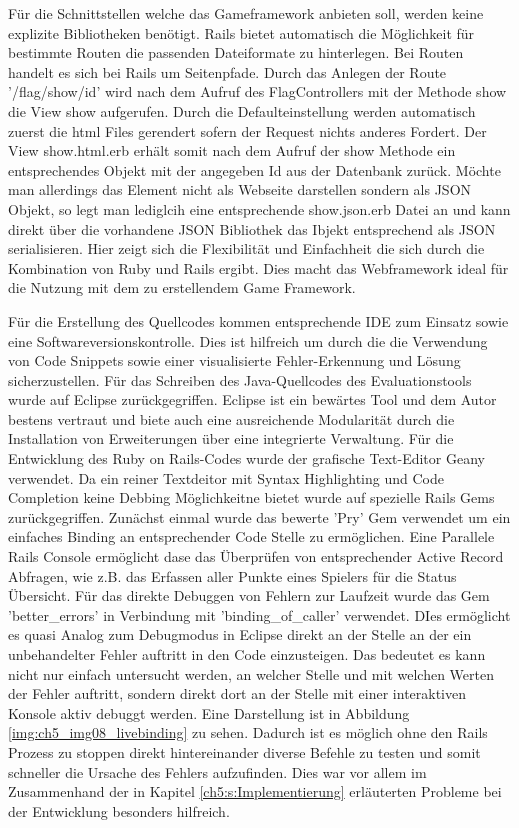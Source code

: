 Für die Schnittstellen welche das Gameframework anbieten soll, werden keine explizite Bibliotheken benötigt. Rails bietet automatisch die Möglichkeit für bestimmte Routen die passenden Dateiformate zu hinterlegen. Bei Routen handelt es sich bei Rails um Seitenpfade. Durch das Anlegen der Route '/flag/show/{id}' wird nach dem Aufruf des FlagControllers mit der Methode show die View show aufgerufen. Durch die Defaulteinstellung werden automatisch zuerst die html Files gerendert sofern der Request nichts anderes Fordert. Der View show.html.erb erhält somit nach dem Aufruf der show Methode ein entsprechendes Objekt mit der angegeben Id aus der Datenbank zurück. Möchte man allerdings das Element nicht als Webseite darstellen sondern als JSON Objekt, so legt man lediglcih eine entsprechende show.json.erb Datei an und kann direkt über die vorhandene JSON Bibliothek das Ibjekt entsprechend als JSON serialisieren.
Hier zeigt sich die Flexibilität und Einfachheit die sich durch die Kombination von Ruby und Rails ergibt. Dies macht das Webframework ideal für die Nutzung mit dem zu erstellendem Game Framework.

Für die Erstellung des Quellcodes kommen entsprechende IDE zum Einsatz sowie eine Softwareversionskontrolle. Dies ist hilfreich um durch die die Verwendung von Code Snippets sowie einer visualisierte Fehler-Erkennung und Lösung sicherzustellen.
Für das Schreiben des Java-Quellcodes des Evaluationstools wurde auf Eclipse zurückgegriffen. Eclipse ist ein bewärtes Tool und dem Autor bestens vertraut und  biete auch eine ausreichende Modularität durch die Installation von Erweiterungen über eine integrierte Verwaltung.
Für die Entwicklung des Ruby on Rails-Codes wurde der grafische Text-Editor Geany verwendet. Da ein reiner Textdeitor mit Syntax Highlighting und Code Completion keine Debbing Möglichkeitne bietet wurde auf spezielle Rails Gems zurückgegriffen.
Zunächst einmal wurde das bewerte 'Pry' Gem verwendet um ein einfaches Binding an entsprechender Code Stelle zu ermöglichen. Eine Parallele Rails Console ermöglicht dase das Überprüfen von entsprechender Active Record Abfragen, wie z.B. das Erfassen aller Punkte eines Spielers für die Status Übersicht. Für das direkte Debuggen von Fehlern zur Laufzeit  wurde das Gem 'better\_errors' in Verbindung mit 'binding\_of\_caller' verwendet. DIes ermöglicht es quasi Analog zum Debugmodus in Eclipse direkt an der Stelle an der ein unbehandelter Fehler auftritt in den Code einzusteigen. Das bedeutet es kann nicht nur einfach untersucht werden, an welcher Stelle und mit welchen Werten der Fehler auftritt, sondern direkt dort an der Stelle mit einer interaktiven Konsole aktiv debuggt werden. Eine Darstellung ist in Abbildung \ref{img:ch5_img08_livebinding} zu sehen. Dadurch ist es möglich ohne den Rails Prozess zu stoppen direkt hintereinander diverse Befehle zu testen und somit schneller die Ursache des Fehlers aufzufinden. Dies war vor allem im Zusammenhand der in Kapitel \ref{ch5:s:Implementierung} erläuterten Probleme bei der Entwicklung besonders hilfreich.

